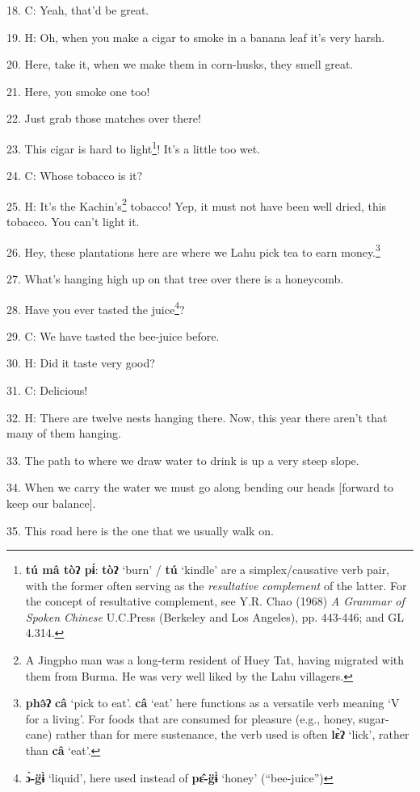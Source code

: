18. C: Yeah, that'd be great.

19. H: Oh, when you make a cigar to smoke in a banana leaf it's very harsh.

20. Here, take it, when we make them in corn-husks, they smell great.

21. Here, you smoke one too!

22. Just grab those matches over there!

23. This cigar is hard to light\footnote{\textbf{tú mâ tòʔ pɨ́}: \textbf{tòʔ} `burn' / \textbf{tú} `kindle' are a simplex/causative verb pair, with the former often serving as the \textit{resultative complement} of the latter. For the concept of resultative complement, see Y.R. Chao (1968) \textit{A Grammar of Spoken Chinese} U.C.Press (Berkeley and Los Angeles), pp. 443-446; and GL 4.314.}! It's a little too wet.

24. C: Whose tobacco is it?

25. H: It's the Kachin's\footnote{A Jingpho man was a long-term resident of Huey Tat, having migrated with them from Burma. He was very well liked by the Lahu villagers.} tobacco! Yep, it must not have been well dried, this
tobacco. You can't light it.

26. Hey, these plantations here are where we Lahu pick tea to earn money.\footnote{\textbf{phə̂ʔ} \textbf{câ} `pick to eat'. \textbf{câ} `eat' here functions as a versatile verb meaning `V for a living'. For foods that are consumed for pleasure (e.g., honey, sugar-cane) rather than for mere sustenance, the verb used is often \textbf{lɛ̀ʔ} `lick', rather than \textbf{câ} `eat'.}

27. What's hanging high up on that tree over there is a honeycomb.

28. Have you ever tasted the juice\footnote{\textbf{ɔ̀-g̈ɨ̀} `liquid', here used instead of \textbf{pɛ̂-g̈ɨ̀} `honey' (``bee-juice'')}?

29. C: We have tasted the bee-juice before.

30. H: Did it taste very good?

31. C: Delicious!

32. H: There are twelve nests hanging there. Now, this year there aren't that many
of them hanging.

33. The path to where we draw water to drink is up a very steep slope.

34. When we carry the water we must go along bending our heads [forward to keep
our balance].

35. This road here is the one that we usually walk on.

